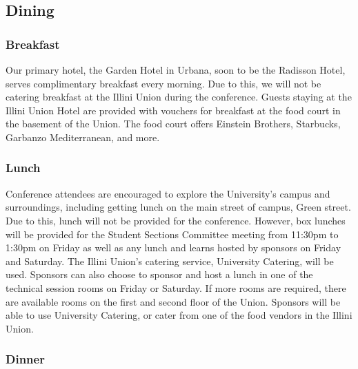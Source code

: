 \subsection{Dining}
\subsubsection{Breakfast}
Our primary hotel, the Garden Hotel in Urbana, soon to be the Radisson Hotel, serves complimentary breakfast every morning. Due to this, we will not be catering breakfast at the Illini Union during the conference. Guests staying at the Illini Union Hotel are provided with vouchers for breakfast at the food court in the basement of the Union. The food court offers Einstein Brothers, Starbucks, Garbanzo Mediterranean, and more. 
\subsubsection{Lunch}
Conference attendees are encouraged to explore the University’s campus and surroundings, including getting lunch on the main street of campus, Green street. Due to this, lunch will not be provided for the conference. However, box lunches will be provided for the Student Sections Committee meeting from 11:30pm to 1:30pm on Friday as well as any lunch and learns hosted by sponsors on Friday and Saturday. The Illini Union’s catering service, University Catering, will be used. Sponsors can also choose to sponsor and host a lunch in one of the technical session rooms on Friday or Saturday. If more rooms are required, there are available rooms on the first and second floor of the Union. Sponsors will be able to use University Catering, or cater from one of the food vendors in the Illini Union.
\subsubsection{Dinner}

